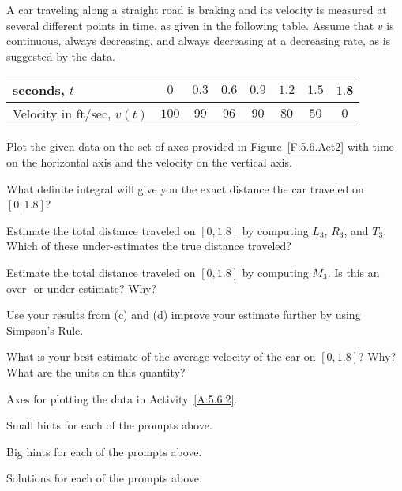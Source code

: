 

\begin{activity} \label{A:5.6.2}  A car traveling along a straight road is braking and its velocity is measured at several different points in time, as given in the following table.  Assume that $v$ is continuous, always decreasing, and always decreasing at a decreasing rate, as is suggested by the data.
\begin{center}
\begin{tabular}{|l|c|c|c|c|c|c|c|}
\hline
seconds, $t$ & $0$ & $0.3$ & $0.6$ & $0.9$ & $1.2$ & $1.5$ & $1.$8 \\
\hline
Velocity in ft/sec, $v(t)$ & $100$ & $99$ & $96$ & $90$ & $80$ & $50$ & $0$ \\
\hline
\end{tabular}
\end{center}
\ba
	\item Plot the given data on the set of axes provided in Figure~\ref{F:5.6.Act2} with time on the horizontal axis and the velocity on the vertical axis.
	\item What definite integral will give you the exact distance the car traveled on $[0,1.8]$?
	\item Estimate the total distance traveled on $[0,1.8]$ by computing $L_3$, $R_3$, and $T_3$.  Which of these under-estimates the true distance traveled?
	\item Estimate the total distance traveled on $[0,1.8]$ by computing $M_3$.  Is this an over- or under-estimate?  Why?
	\item Use your results from (c) and (d) improve your estimate further by using Simpson's Rule.
	\item What is your best estimate of the average velocity of the car on $[0,1.8]$?  Why?  What are the units on this quantity?
\ea

\end{activity}

\begin{marginfigure}[-6cm]
\caption{Axes for plotting the data in Activity~\ref{A:5.6.2}.} 
\label{F:5.6.Act2}
\end{marginfigure}
\begin{smallhint}
\ba
	\item Small hints for each of the prompts above.
\ea
\end{smallhint}
\begin{bighint}
\ba
	\item Big hints for each of the prompts above.
\ea
\end{bighint}
\begin{activitySolution}
\ba
	\item Solutions for each of the prompts above.
\ea
\end{activitySolution}
\aftera